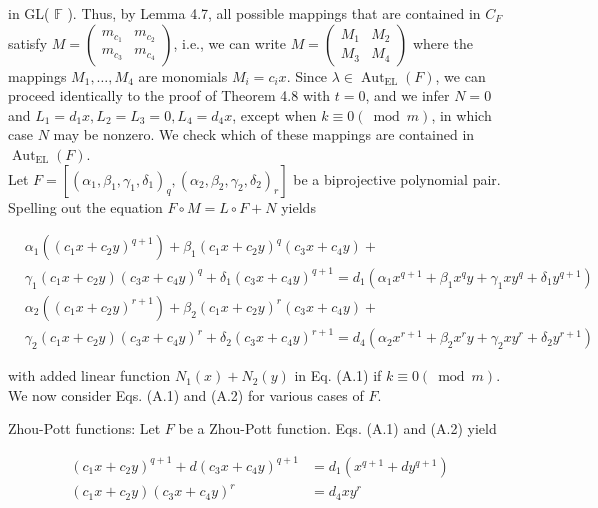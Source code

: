 \documentclass[10pt]{article}
\begin{document}
in GL( $\mathbb{F}$ ). Thus, by Lemma 4.7, all possible mappings that are contained in $C_{F}$ satisfy $M= \left(\begin{array}{ll}m_{c_{1}} & m_{c_{2}} \\ m_{c_{3}} & m_{c_{4}}\end{array}\right)$, i.e., we can write $M=\left(\begin{array}{ll}M_{1} & M_{2} \\ M_{3} & M_{4}\end{array}\right)$ where the mappings $M_{1}, \ldots, M_{4}$ are monomials $M_{i}=c_{i} x$. Since $\lambda \in \operatorname{Aut}_{\mathrm{EL}}(F)$, we can proceed identically to the proof of Theorem 4.8 with $t=0$, and we infer $N=0$ and $L_{1}=d_{1} x, L_{2}=L_{3}=0, L_{4}=d_{4} x$, except when $k \equiv 0 (\bmod m)$, in which case $N$ may be nonzero. We check which of these mappings are contained in $\operatorname{Aut}_{\mathrm{EL}}(F)$.\\
Let $F=\left[\left(\alpha_{1}, \beta_{1}, \gamma_{1}, \delta_{1}\right)_{q},\left(\alpha_{2}, \beta_{2}, \gamma_{2}, \delta_{2}\right)_{r}\right]$ be a biprojective polynomial pair. Spelling out the equation $F \circ M=L \circ F+N$ yields


\begin{align*}
& \alpha_{1}\left(\left(c_{1} x+c_{2} y\right)^{q+1}\right)+\beta_{1}\left(c_{1} x+c_{2} y\right)^{q}\left(c_{3} x+c_{4} y\right)+ \\
& \gamma_{1}\left(c_{1} x+c_{2} y\right)\left(c_{3} x+c_{4} y\right)^{q}+\delta_{1}\left(c_{3} x+c_{4} y\right)^{q+1}=d_{1}\left(\alpha_{1} x^{q+1}+\beta_{1} x^{q} y+\gamma_{1} x y^{q}+\delta_{1} y^{q+1}\right)  \tag{A.1}\\
& \alpha_{2}\left(\left(c_{1} x+c_{2} y\right)^{r+1}\right)+\beta_{2}\left(c_{1} x+c_{2} y\right)^{r}\left(c_{3} x+c_{4} y\right)+ \\
& \gamma_{2}\left(c_{1} x+c_{2} y\right)\left(c_{3} x+c_{4} y\right)^{r}+\delta_{2}\left(c_{3} x+c_{4} y\right)^{r+1}=d_{4}\left(\alpha_{2} x^{r+1}+\beta_{2} x^{r} y+\gamma_{2} x y^{r}+\delta_{2} y^{r+1}\right) \tag{A.2}
\end{align*}


with added linear function $N_{1}(x)+N_{2}(y)$ in Eq. (A.1) if $k \equiv 0(\bmod m)$. We now consider Eqs. (A.1) and (A.2) for various cases of $F$.

Zhou-Pott functions: Let $F$ be a Zhou-Pott function. Eqs. (A.1) and (A.2) yield


\begin{align*}
\left(c_{1} x+c_{2} y\right)^{q+1}+d\left(c_{3} x+c_{4} y\right)^{q+1} & =d_{1}\left(x^{q+1}+d y^{q+1}\right)  \tag{A.3}\\
\left(c_{1} x+c_{2} y\right)\left(c_{3} x+c_{4} y\right)^{r} & =d_{4} x y^{r} \tag{A.4}
\end{align*}
\end{document}
